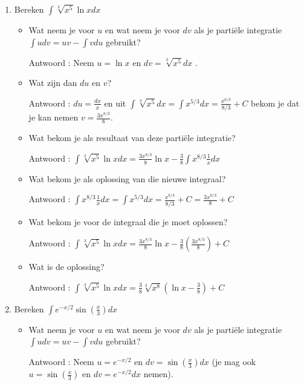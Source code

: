 \begin{enumerate}
	\item Bereken $\int \sqrt[3]{x^5} \ln x dx$
	
	\begin{itemize}
		
		\item Wat neem je voor $u$ en wat neem je voor $dv$ als je parti\"ele integratie $\int udv = uv -\int vdu$ gebruikt?
		
		Antwoord : Neem $u= \ln x$ en $dv=\sqrt[3]{x^5}dx$ .
		
		\item Wat zijn dan $du$ en $v$?
		
		Antwoord : $du=\frac{dx}{x}$ en uit $\int \sqrt[3]{x^5}dx=\int x^{5/3}dx=\frac{x^{8/3}}{8/3}+C$ bekom je dat je kan nemen $v=\frac{3x^{8/3}}{8}$.
		
		\item Wat bekom je als resultaat van deze parti\"ele integratie?
		
		Antwoord : $\int \sqrt[3]{x^5} \ln x dx=\frac{3x^{8/3}}{8} \ln x-\frac{3}{8}\int x^{8/3}\frac{1}{x}dx$
		
		\item Wat bekom je als oplossing van die nieuwe integraal?
		
		Antwoord : $\int x^{8/3}\frac{1}{x}dx=\int x^{5/3}dx=\frac{x^{8/3}}{8/3}+C=\frac{3x^{8/3}}{8}+C$
		
		\item Wat bekom je voor de integraal die je moet oplossen?
		
		Antwoord :  $\int \sqrt[3]{x^5} \ln x dx=\frac{3x^{8/3}}{8} \ln x-\frac{3}{8}\left( \frac{3x^{8/3}}{8}  \right)+C$
		
		\item Wat is de oplossing?
		
		Antwoord :  $\int \sqrt[3]{x^5} \ln x dx= \frac{3}{8} \sqrt[3]{x^8} \left( \ln x -\frac {3}{8}  \right) +C$
		
	\end{itemize}
	
	\item Bereken $\int e^{-x/2}\sin \left( \frac{x}{3}  \right)dx$
	
	\begin{itemize}
		
		\item Wat neem je voor $u$ en wat neem je voor $dv$ als je parti\"ele integratie $\int udv = uv -\int vdu$ gebruikt?
		
		Antwoord : Neem $u=e^{-x/2}$ en $dv=\sin \left( \frac{x}{3}  \right)dx$ (je mag ook $u=\sin \left( \frac{x}{3}  \right)$ en $dv=e^{-x/2}dx$ nemen).
		

\end{itemize}
\end{enumerate}
